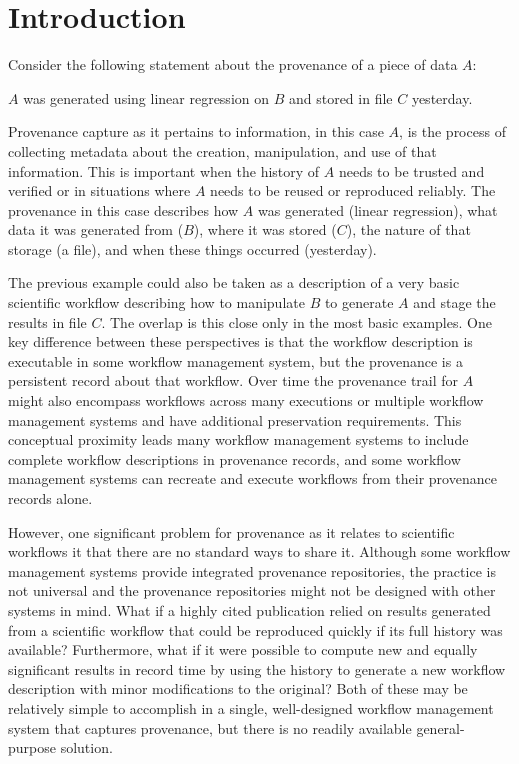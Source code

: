 \documentclass[sigconf]{acmart}
\begin{document}
\section{Introduction}
Consider the following statement about the provenance of a piece of data $A$:
\begin{displayquote}
    $A$ was generated using linear regression on $B$ and stored in file $C$ yesterday.
\end{displayquote}
Provenance capture as it pertains to information, in this case $A$, is the process of collecting metadata about the creation, manipulation, and use of that information. This is important when the history of $A$ needs to be trusted and verified or in situations where $A$ needs to be reused or reproduced reliably. The provenance in this case describes how $A$ was generated (linear regression), what data it was generated from ($B$), where it was stored ($C$), the nature of that storage (a file), and when these things occurred (yesterday). 

The previous example could also be taken as a description of a very basic scientific workflow describing how to manipulate $B$ to generate $A$ and stage the results in file $C$. The overlap is this close only in the most basic examples. One key difference between these perspectives is that the workflow description is executable in some workflow management system, but the provenance is a persistent record about that workflow. Over time the provenance trail for $A$ might also encompass workflows across many executions or multiple workflow management systems and have additional preservation requirements. This conceptual proximity leads many workflow management systems to include complete workflow descriptions in provenance records, and some workflow management systems can recreate and execute workflows from their provenance records alone.

However, one significant problem for provenance as it relates to scientific workflows it that there are no standard ways to share it. Although some workflow management systems provide integrated provenance repositories, the practice is not universal and the provenance repositories might not be designed with other systems in mind. What if a highly cited publication relied on results generated from a scientific workflow that could be reproduced quickly if its full history was available? Furthermore, what if it were possible to compute new and equally significant results in record time by using the history to generate a new workflow description with minor modifications to the original? Both of these may be relatively simple to accomplish in a single, well-designed workflow management system that captures provenance, but there is no readily available general-purpose solution.
\end{document}
